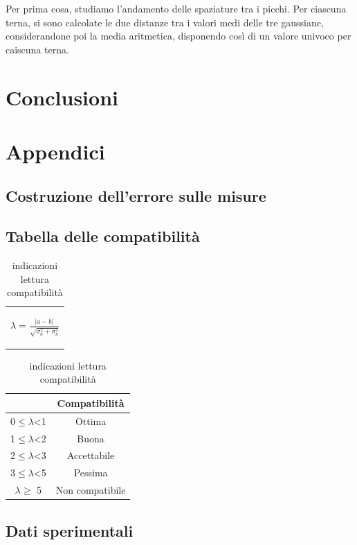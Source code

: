 \documentclass{article}
\begin{document}
Per prima cosa, studiamo l'andamento delle spaziature tra i picchi. 
Per ciascuna terna, si sono calcolate le due distanze tra i valori medi
delle tre gaussiane, considerandone poi la media aritmetica, disponendo
così di un valore univoco per caiscuna terna.

\section*{Conclusioni}



\newpage
\appendix
\section{Appendici}
\label{appendice}
\subsection{Costruzione dell'errore sulle misure}
\label{Calcerr}

\subsection{Tabella delle compatibilità}
\medskip
\begin{table}[H]
    \centering
    \begin{tabular}{c}
        \begin{Large}
        $\lambda=\frac{|a-b|}{\sqrt{\sigma_a^2+\sigma_b^2}}$
        \end{Large}\\
    \end{tabular}
    \hspace{0.5cm}
    \begin{tabular}{cc}
        \toprule
        &       \textbf{Compatibilità   }       \\
        \midrule
        0$\leq \lambda$<1   &Ottima                 \\
        1$\leq \lambda$<2   &Buona                  \\
        2$\leq \lambda$<3   &Accettabile            \\
        3$\leq\lambda$<5   &Pessima                \\
        $ \lambda \geq $  5     &Non compatibile        \\
        \bottomrule
    \end{tabular}
    \caption{indicazioni lettura compatibilità}
    \label{tab:compatibilità}
\end{table}

\subsection{Dati sperimentali}


   
\end{document}
